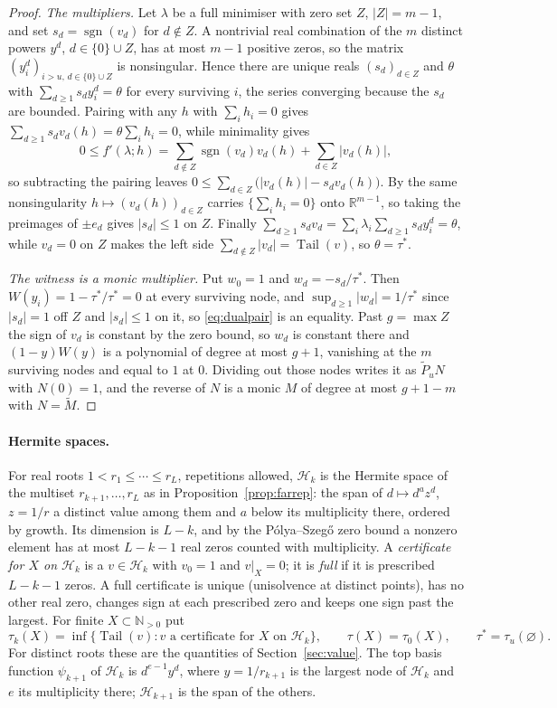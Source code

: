 \documentclass[11pt]{article}
\theoremstyle{definition}
\theoremstyle{plain}
\newcommand{\R}{\mathbb R}
\newcommand{\N}{\mathbb N}
\DeclareMathOperator{\Tail}{Tail}
\DeclareMathOperator{\sgn}{sgn}
\begin{document}
\begin{proof}
\emph{The multipliers.}  Let $\lambda$ be a full minimiser with zero set
$Z$, $|Z|=m-1$, and set $s_d=\sgn(v_d)$ for $d\notin Z$.  A nontrivial real
combination of the $m$ distinct powers $y^d$, $d\in\{0\}\cup Z$, has at most
$m-1$ positive zeros, so the matrix $(y_i^d)_{i>u,\,d\in\{0\}\cup Z}$ is
nonsingular.  Hence there are unique reals $(s_d)_{d\in Z}$ and $\theta$
with $\sum_{d\ge1}s_dy_i^d=\theta$ for every surviving $i$, the series
converging because the $s_d$ are bounded.  Pairing with any $h$ with
$\sum_ih_i=0$ gives $\sum_{d\ge1}s_dv_d(h)=\theta\sum_ih_i=0$, while
minimality gives
\[
  0\le f'(\lambda;h)=\sum_{d\notin Z}\sgn(v_d)v_d(h)+\sum_{d\in Z}|v_d(h)|,
\]
so subtracting the pairing leaves
$0\le\sum_{d\in Z}\bigl(|v_d(h)|-s_dv_d(h)\bigr)$.  By the same
nonsingularity $h\mapsto(v_d(h))_{d\in Z}$ carries $\{\sum_ih_i=0\}$ onto
$\R^{m-1}$, so taking the preimages of $\pm e_d$ gives $|s_d|\le1$ on $Z$.
Finally $\sum_{d\ge1}s_dv_d=\sum_i\lambda_i\sum_{d\ge1}s_dy_i^d=\theta$,
while $v_d=0$ on $Z$ makes the left side $\sum_{d\notin Z}|v_d|=\Tail(v)$,
so $\theta=\tau^*$.

\emph{The witness is a monic multiplier.}  Put $w_0=1$ and
$w_d=-s_d/\tau^*$.  Then $W(y_i)=1-\tau^*/\tau^*=0$ at every surviving node,
and $\sup_{d\ge1}|w_d|=1/\tau^*$ since $|s_d|=1$ off $Z$ and $|s_d|\le1$ on
it, so \eqref{eq:dualpair} is an equality.  Past $g=\max Z$ the sign of
$v_d$ is constant by the zero bound, so $w_d$ is constant there and
$(1-y)W(y)$ is a polynomial of degree at most $g+1$, vanishing at the $m$
surviving nodes and equal to $1$ at $0$.  Dividing out those nodes writes it
as $\widetilde P_uN$ with $N(0)=1$, and the reverse of $N$ is a monic $M$ of
degree at most $g+1-m$ with $N=\widetilde M$.
\end{proof}

\paragraph{Hermite spaces.}  For real roots
$1<r_1\le\cdots\le r_L$, repetitions allowed, $\mathcal H_k$ is the Hermite
space of the multiset $r_{k+1},\ldots,r_L$ as in
Proposition~\ref{prop:farrep}: the span of $d\mapsto d^az^d$, $z=1/r$ a
distinct value among them and $a$ below its multiplicity there, ordered by
growth.  Its dimension is $L-k$, and by the P\'olya--Szeg\H o zero bound a
nonzero element has at most $L-k-1$ real zeros counted with multiplicity.
A \emph{certificate for $X$ on $\mathcal H_k$} is a $v\in\mathcal H_k$ with
$v_0=1$ and $v|_X=0$; it is \emph{full} if it is prescribed $L-k-1$ zeros.  A
full certificate is unique (unisolvence at distinct points), has no other
real zero, changes sign at each prescribed zero and keeps one sign past the
largest.  For finite $X\subset\N_{>0}$ put
\[
  \tau_k(X)=\inf\{\Tail(v):v\text{ a certificate for }X\text{ on }\mathcal H_k\},
  \qquad \tau(X)=\tau_0(X),\qquad \tau^*=\tau_u(\varnothing).
\]
For distinct roots these are the quantities of Section~\ref{sec:value}.  The top basis function $\psi_{k+1}$ of $\mathcal H_k$ is
$d^{e-1}y^d$, where $y=1/r_{k+1}$ is the largest node of $\mathcal H_k$ and
$e$ its multiplicity there; $\mathcal H_{k+1}$ is the span of the others.
\end{document}
